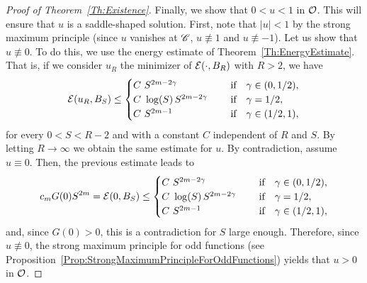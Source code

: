 \begin{proof}[Proof of Theorem~\ref{Th:Existence}]
Finally, we show that $0<u<1$ in $\mathcal{O}$. This will ensure that $u$ is a saddle-shaped solution. First, note that $|u| < 1$ by the strong maximum principle (since $u$ vanishes at $\mathscr{C}$, $u \not \equiv 1$  and $u\not\equiv -1$). Let us show that $u\not\equiv 0$. To do this, we use the energy estimate of Theorem~\ref{Th:EnergyEstimate}. That is, if we consider $u_R$ the minimizer of $\mathcal{E}(\cdot, B_R)$ with $R > 2$, we have
$$
\mathcal{E} (u_R,B_S) \leq \begin{cases}
C \ S^{2m-2\gamma}\ \ \ \ &\textrm{if } \ \ \gamma\in(0,1/2),\\
C\ \log(S)\,S^{2m-2\gamma}\ \ \ \ &\textrm{if } \ \ \gamma=1/2,\\
C \ S^{2m-1}\ \ \ \ &\textrm{if } \ \ \gamma\in(1/2,1),\\
\end{cases} $$
for every $0 < S < R-2$ and with a constant $C$ independent of $R$ and $S$. By letting $R \to \infty$ we obtain the same estimate for $u$. By contradiction, assume $u\equiv 0$. Then, the previous estimate leads to
$$
c_m G(0)S^{2m} = \mathcal{E}(0, B_S) \leq \begin{cases}
C \ S^{2m-2\gamma}\ \ \ \ &\textrm{if } \ \ \gamma\in(0,1/2),\\
C\ \log(S)\,S^{2m-2\gamma}\ \ \ \ &\textrm{if } \ \ \gamma=1/2,\\
C \ S^{2m-1}\ \ \ \ &\textrm{if } \ \ \gamma\in(1/2,1),\\
\end{cases} $$
and, since $G(0)>0$, this is a contradiction for $S$ large enough. Therefore, since $u \not \equiv 0$, the strong maximum principle for odd functions (see Proposition~\ref{Prop:StrongMaximumPrincipleForOddFunctions}) yields that $u>0$ in $\mathcal{O}$. 
\end{proof}

